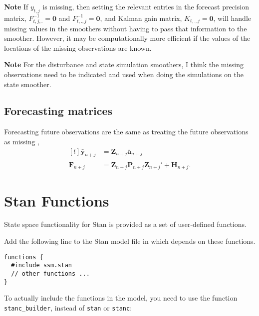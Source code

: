 \documentclass[]{book}
\newenvironment{Shaded}{\begin{snugshade}}{\end{snugshade}}
\newcommand{\KeywordTok}[1]{\textcolor[rgb]{0.13,0.29,0.53}{\textbf{{#1}}}}
\newcommand{\DataTypeTok}[1]{\textcolor[rgb]{0.13,0.29,0.53}{{#1}}}
\newcommand{\StringTok}[1]{\textcolor[rgb]{0.31,0.60,0.02}{{#1}}}
\newcommand{\NormalTok}[1]{{#1}}
\newcommand{\mat}[1]{\boldsymbol{#1}}
\renewcommand{\vec}[1]{\boldsymbol{#1}}
\renewcommand{\T}{'}
\begin{document}
\textbf{Note} If \(y_{t,j}\) is missing, then setting the relevant
entries in the forecast precision matrix, \(F^{-1}_{t,j,.} = \vec{0}\)
and \(F^{-1}_{t,.,j} = \vec{0}\), and Kalman gain matrix,
\(K_{t,.,j} = \vec{0}\), will handle missing values in the smoothers
without having to pass that information to the smoother. However, it may
be computationally more efficient if the values of the locations of the
missing observations are known.

\textbf{Note} For the disturbance and state simulation smoothers, I
think the missing observations need to be indicated and used when doing
the simulations on the state smoother.

\section{Forecasting matrices}\label{forecasting-matrices}

Forecasting future observations are the same as treating the future
observations as missing \autocite[Sec 4.11]{DurbinKoopman2012}, \[
\begin{aligned}[t]
\bar{\vec{y}}_{n + j} &= \mat{Z}_{n + j} \bar{\vec{a}}_{n + j} \\
\bar{\mat{F}}_{n + j} &= \mat{Z}_{n + j} \bar{\mat{P}}_{n + j} \mat{Z}_{n + j}\T + \mat{H}_{n + j} .
\end{aligned}
\]

\chapter{Stan Functions}\label{stan-functions}

State space functionality for Stan is provided as a set of user-defined
functions.

Add the following line to the Stan model file in which depends on these
functions.

\begin{verbatim}
functions {
  #include ssm.stan
  // other functions ...
}
\end{verbatim}

To actually include the functions in the model, you need to use the
function \texttt{stanc\_builder}, instead of \texttt{stan} or
\texttt{stanc}:

\begin{Shaded}
\end{Shaded}
\end{document}
